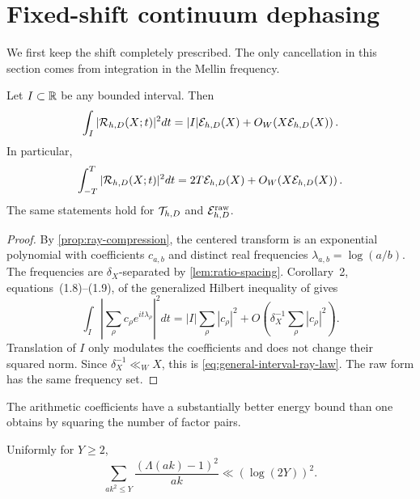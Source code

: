 \section{Fixed-shift continuum dephasing}
\label{sec:fixed-shift}

We first keep the shift completely prescribed.  The only cancellation in
this section comes from integration in the Mellin frequency.

\begin{theorem}
\label{thm:fixed-ray-mean-square}
Let $I\subset\mathbb R$ be any bounded interval.  Then
\begin{equation}
 \int_I|\mathcal R_{h,D}(X;t)|^2dt
 =|I|\mathcal E_{h,D}(X)+O_W\!\left(X\mathcal E_{h,D}(X)\right).
 \label{eq:general-interval-ray-law}
\end{equation}
In particular,
\begin{equation}
 \int_{-T}^{T}|\mathcal R_{h,D}(X;t)|^2dt
 =2T\mathcal E_{h,D}(X)+O_W\!\left(X\mathcal E_{h,D}(X)\right).
 \label{eq:hard-band-ray-law}
\end{equation}
The same statements hold for $\mathcal T_{h,D}$ and
$\mathcal E^{\mathrm{raw}}_{h,D}$.
\end{theorem}

\begin{proof}
By \cref{prop:ray-compression}, the centered transform is an exponential
polynomial with coefficients $c_{a,b}$ and distinct real frequencies
$\lambda_{a,b}=\log(a/b)$.  The frequencies are $\delta_X$-separated by
\cref{lem:ratio-spacing}.  Corollary~2, equations~(1.8)--(1.9), of the
generalized Hilbert inequality of \citet{MontgomeryVaughan1974} gives
\[
 \int_I\left|\sum_\rho c_\rho e^{it\lambda_\rho}\right|^2dt
 =|I|\sum_\rho|c_\rho|^2
 +O\!\left(\delta_X^{-1}\sum_\rho|c_\rho|^2\right).
\]
Translation of $I$ only modulates the coefficients and does not change
their squared norm.  Since $\delta_X^{-1}\ll_W X$, this is
\eqref{eq:general-interval-ray-law}.  The raw form has the same frequency
set.
\end{proof}

The arithmetic coefficients have a substantially better energy bound than
one obtains by squaring the number of factor pairs.

\begin{lemma}
\label{lem:source-ray-square-ledger}
Uniformly for $Y\geq2$,
\begin{equation}
 \sum_{ak^2\leq Y}\frac{(\Lambda(ak)-1)^2}{ak}
 \ll (\log(2Y))^2.
 \label{eq:source-ray-square-ledger}
\end{equation}
\end{lemma}

